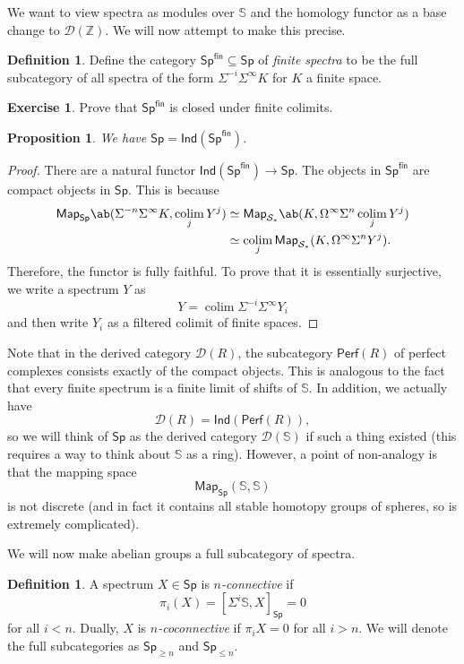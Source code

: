 \documentclass[10pt, oneside]{memoir}
\newtheorem{prop}[thm]{Proposition}
\theoremstyle{definition}
\newtheorem{defn}[thm]{Definition}
\newtheorem{exer}[thm]{Exercise}
\theoremstyle{remark}
\theoremstyle{plain}
\theoremstyle{definition}
\theoremstyle{remark}
\newcommand{\Z}{\mathbb{Z}}
\newcommand{\bS}{\mathbb{S}}
\newcommand{\mc}[1]{\mathcal{#1}}
\newcommand{\ms}[1]{\mathsf{#1}}
\newcommand{\1}{\mathbf{1}}
\newcommand{\2}{\mathbf{2}}
\newcommand{\3}{\mathbf{3}}
\DeclareMathOperator*{\colim}{colim}
\begin{document}
We want to view spectra as modules over $\bS$ and the homology functor as a base change to $\mc{D}(\Z)$. We will now attempt to make this precise.

\begin{defn}
    Define the category $\ms{Sp}^{\ms{fin}} \subseteq \ms{Sp}$ of \textit{finite spectra} to be the full subcategory of all spectra of the form $\Sigma^{-i} \Sigma^{\infty} K$ for $K$ a finite space.
\end{defn}

\begin{exer}
    Prove that $\ms{Sp}^{\ms{fin}}$ is closed under finite colimits.
\end{exer}

\begin{prop}
    We have $\ms{Sp} = \ms{Ind}(\ms{Sp}^{\ms{fin}})$.
\end{prop}

\begin{proof}
    There are a natural functor $\ms{Ind}(\ms{Sp}^{\ms{fin}}) \to \ms{Sp}$. The objects in $\ms{Sp}^{\ms{fin}}$ are compact objects in $\ms{Sp}$. This is because
    \begin{align*}
        \ms{Map}_{\ms{Sp}}\ab(\Sigma^{-n} \Sigma^{\infty} K, \colim_j Y^j) &\simeq \ms{Map}_{\mc{S}_*} \ab(K, \Omega^{\infty} \Sigma^n \colim_j Y^j) \\
        &\simeq \colim_j \ms{Map}_{\mc{S}_*}(K, \Omega^{\infty} \Sigma^n Y^j).
    \end{align*}
    Therefore, the functor is fully faithful. To prove that it is essentially surjective, we write a spectrum $Y$ as
    \[ Y = \colim \Sigma^{-i} \Sigma^{\infty} Y_i \]
    and then write $Y_i$ as a filtered colimit of finite spaces.
\end{proof}

Note that in the derived category $\mc{D}(R)$, the subcategory $\ms{Perf}(R)$ of perfect complexes consists exactly of the compact objects. This is analogous to the fact that every finite spectrum is a finite limit of shifts of $\bS$. In addition, we actually have
\[ \mc{D}(R) = \ms{Ind}(\ms{Perf}(R)), \]
so we will think of $\ms{Sp}$ as the derived category $\mc{D}(\bS)$ if such a thing existed (this requires a way to think about $\bS$ as a ring). However, a point of non-analogy is that the mapping space
\[ \ms{Map}_{\ms{Sp}}(\bS, \bS) \]
is not discrete (and in fact it contains all stable homotopy groups of spheres, so is extremely complicated).

We will now make abelian groups a full subcategory of spectra.
\begin{defn}
    A spectrum $X \in \ms{Sp}$ is \textit{$n$-connective} if 
    \[ \pi_i (X) = [\Sigma^i \bS, X]_{\ms{Sp}} = 0 \] 
    for all $i < n$. Dually, $X$ is \textit{$n$-coconnective} if $\pi_i X = 0$ for all $i > n$. We will denote the full subcategories as $\ms{Sp}_{\geq n}$ and $\ms{Sp}_{\leq n}$.
\end{defn}
\end{document}
